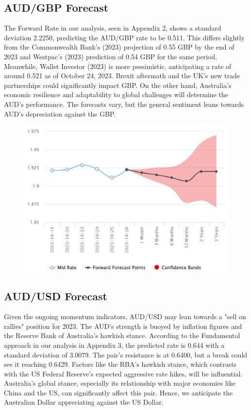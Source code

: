 \documentclass{article}
\let\Oldsubsection\subsection
\renewcommand{\subsection}{\FloatBarrier\Oldsubsection}
\begin{document}
\break

\subsection*{AUD/GBP Forecast}

\noindent The Forward Rate in our analysis, seen in Appendix 2, shows a standard deviation 2.2250, predicting the AUD/GBP rate to be 0.511. This differs slightly from the Commonwealth Bank's (2023) projection of 0.55 GBP by the end of 2023 and Westpac's (2023) prediction of 0.54 GBP for the same period. Meanwhile, Wallet Investor (2023) is more pessimistic, anticipating a rate of around 0.521 as of October 24, 2023. Brexit aftermath and the UK's new trade partnerships could significantly impact GBP. On the other hand, Australia's economic resilience and adaptability to global challenges will determine the AUD's performance. The forecasts vary, but the general sentiment leans towards AUD's depreciation against the GBP.\\

\begin{figure}[h!]
    \centering
    \includegraphics[scale=0.7]{graphs/AUDGBP.png}
\end{figure}

\break

\subsection*{AUD/USD Forecast}

\noindent Given the ongoing momentum indicators, AUD/USD may lean towards a "sell on rallies" position for 2023. The AUD's strength is buoyed by inflation figures and the Reserve Bank of Australia's hawkish stance. According to the Fundamental approach in our analysis in Appendix 3, the predicted rate is 0.644 with a standard deviation of 3.0079. The pair's resistance is at 0.6400, but a break could see it reaching 0.6429. Factors like the RBA's hawkish stance, which contrasts with the US Federal Reserve's expected aggressive rate hikes, will be influential. Australia's global stance, especially its relationship with major economies like China and the US, can significantly affect this pair. Hence, we anticipate the Australian Dollar appreciating against the US Dollar.\\
\end{document}
